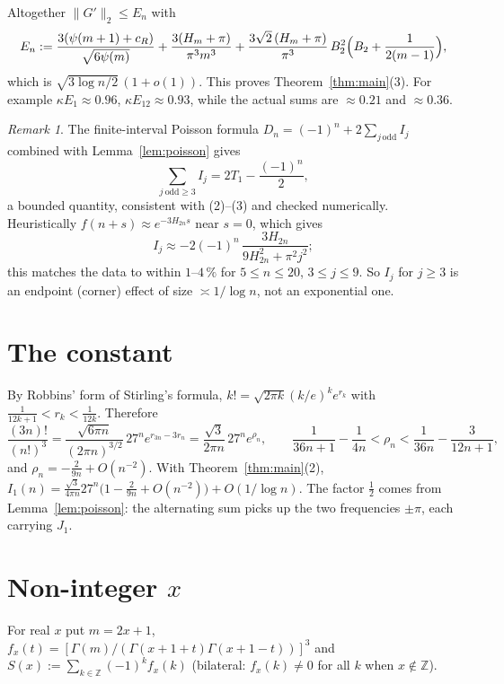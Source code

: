 \documentclass[11pt]{amsart}
\theoremstyle{remark}
\newtheorem{remark}[theorem]{Remark}
\newcommand{\Z}{\mathbb{Z}}
\begin{document}
Altogether $\|G'\|_2\le E_n$ with
\begin{equation}\label{eq:En}
E_n:=\frac{3(\psi(m+1)+c_R)}{\sqrt{6\psi(m)}}+\frac{3(H_m+\pi)}{\pi^3m^3}
+\frac{3\sqrt2\,(H_m+\pi)}{\pi^3}\,B_2^2\Bigl(B_2+\frac1{2(m-1)}\Bigr),
\end{equation}
which is $\sqrt{3\log n/2}\,(1+o(1))$. This proves Theorem~\ref{thm:main}(3). For example
$\kappa E_1\approx 0.96$, $\kappa E_{12}\approx 0.93$, while the actual sums are $\approx 0.21$ and $\approx 0.36$.

\begin{remark}
The finite-interval Poisson formula $D_n=(-1)^n+2\sum_{j\,\mathrm{odd}}I_j$ combined with
Lemma~\ref{lem:poisson} gives
\[\textstyle\sum_{j\ \mathrm{odd}\ge3}I_j=2T_1-\frac{(-1)^n}{2},\]
a bounded quantity, consistent with (2)--(3) and checked numerically.
Heuristically $f(n+s)\approx e^{-3H_{2n}s}$ near $s=0$, which gives
\[I_j\approx-2(-1)^n\,\frac{3H_{2n}}{9H_{2n}^2+\pi^2j^2};\]
this matches the data to within $1$--$4\,\%$ for $5\le n\le20$, $3\le j\le9$.
So $I_j$ for $j\ge3$ is an endpoint (corner) effect of size $\asymp1/\log n$, not an exponential one.
\end{remark}

\section{The constant}
By Robbins' form of Stirling's formula, $k!=\sqrt{2\pi k}(k/e)^ke^{r_k}$ with $\frac1{12k+1}<r_k<\frac1{12k}$. Therefore
\[
\frac{(3n)!}{(n!)^3}=\frac{\sqrt{6\pi n}}{(2\pi n)^{3/2}}\,27^n e^{r_{3n}-3r_n}=\frac{\sqrt3}{2\pi n}\,27^ne^{\rho_n},
\qquad \frac1{36n+1}-\frac1{4n}<\rho_n<\frac1{36n}-\frac3{12n+1},
\]
and $\rho_n=-\frac{2}{9n}+O(n^{-2})$. With Theorem~\ref{thm:main}(2),
$I_1(n)=\frac{\sqrt3}{4\pi n}27^n\bigl(1-\frac2{9n}+O(n^{-2})\bigr)+O(1/\log n)$. The factor $\frac12$ comes from Lemma~\ref{lem:poisson}:
the alternating sum picks up the two frequencies $\pm\pi$, each carrying $J_1$.

\section{Non-integer \texorpdfstring{$x$}{x}}\label{sec:real}

For real $x$ put $m=2x+1$, $f_x(t)=[\Gamma(m)/(\Gamma(x+1+t)\Gamma(x+1-t))]^3$ and $S(x):=\sum_{k\in\Z}(-1)^kf_x(k)$ (bilateral: $f_x(k)\ne0$ for all $k$ when $x\notin\Z$).
\end{document}

